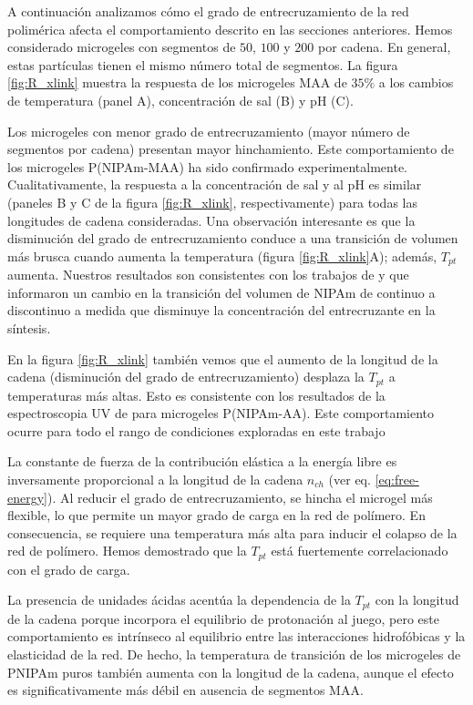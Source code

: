 A continuaci\'on analizamos c\'omo el grado de entrecruzamiento de la red polim\'erica afecta el comportamiento descrito en las secciones anteriores.
Hemos considerado microgeles con segmentos de $50$, $100$ y $200$ por cadena.
En general, estas part\'iculas tienen el mismo n\'umero total de segmentos.
La figura \ref{fig:R_xlink} muestra la respuesta de los microgeles MAA de $35\%$ a los cambios de temperatura (panel A), concentraci\'on de sal (B) y pH (C).

Los microgeles con menor grado de entrecruzamiento (mayor n\'umero de segmentos por cadena) presentan mayor hinchamiento.
Este comportamiento de los microgeles P(NIPAm-MAA) ha sido confirmado experimentalmente.
Cualitativamente, la respuesta a la concentraci\'on de sal y al pH es similar (paneles B y C de la figura \ref{fig:R_xlink}, respectivamente) para todas las longitudes de cadena consideradas.
Una observaci\'on interesante es que la disminuci\'on del grado de entrecruzamiento conduce a una transici\'on de volumen m\'as brusca cuando aumenta la temperatura (figura \ref{fig:R_xlink}A);
adem\'as, $T_{pt}$ aumenta.
Nuestros resultados son consistentes con los trabajos de  y  que informaron un cambio en la transici\'on del volumen de NIPAm de continuo a discontinuo a medida que disminuye la concentraci\'on del entrecruzante en la s\'intesis.


En la figura \ref{fig:R_xlink} tambi\'en vemos que el aumento de la longitud de la cadena (disminuci\'on del grado de entrecruzamiento) desplaza la $T_{pt}$ a temperaturas m\'as altas.
Esto es consistente con los resultados de la espectroscopia UV de  para microgeles P(NIPAm-AA).
Este comportamiento ocurre para todo el rango de condiciones exploradas en este trabajo %


La constante de fuerza de la contribuci\'on el\'astica a la energ\'ia libre es inversamente proporcional a la longitud de la cadena $n_{ch}$ (ver eq. \ref{eq:free-energy}).
Al reducir el grado de entrecruzamiento, se hincha el microgel m\'as flexible, lo que permite un mayor grado de carga en la red de pol\'imero.
En consecuencia, se requiere una temperatura m\'as alta para inducir el colapso de la red de pol\'imero.
Hemos demostrado que la $T_{pt}$ est\'a fuertemente correlacionado con el grado de carga.


La presencia de unidades \'acidas acent\'ua la dependencia de  la $T_{pt}$ con la longitud de la cadena porque incorpora el equilibrio de protonaci\'on al juego, pero este comportamiento es intr\'inseco al equilibrio entre las interacciones hidrof\'obicas y la elasticidad de la red.
De hecho, la temperatura de transici\'on de los microgeles de PNIPAm puros tambi\'en aumenta con la longitud de la cadena, aunque el efecto es significativamente m\'as d\'ebil en ausencia de segmentos MAA.


